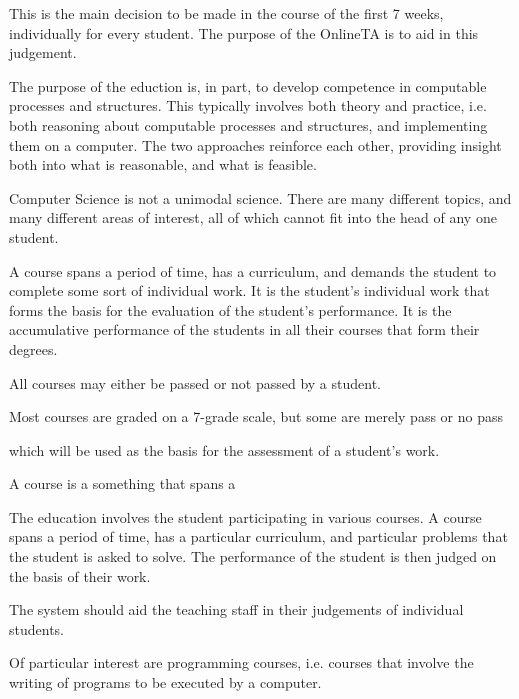This is the
main decision to be made in the course of the first 7 weeks, individually for
every student. The purpose of the OnlineTA is to aid in this judgement.

The purpose of the eduction is, in part, to develop competence in computable
processes and structures. This typically involves both theory and practice,
i.e. both reasoning about computable processes and structures, and implementing
them on a computer. The two approaches reinforce each other, providing insight
both into what is reasonable, and what is feasible.


Computer Science is not a unimodal science. There are many different topics,
and many different areas of interest, all of which cannot fit into the head of
any one student.

A course spans a period of time, has a curriculum, and demands the student to
complete some sort of individual work. It is the student's individual work that
forms the basis for the evaluation of the student's performance. It is the
accumulative performance of the students in all their courses that form their
degrees.

All courses may either be passed or not passed by a student.

Most courses are graded on a 7-grade scale, but some are merely pass or no pass

 which will be used as the basis for the assessment of a student's work.

A course is a something that spans a 

The education involves the student participating in various courses. A course
spans a period of time, has a particular curriculum, and particular problems
that the student is asked to solve. The performance of the student is then
judged on the basis of their work.

 The system
should aid the teaching staff in their judgements of individual students.

Of particular interest are programming courses, i.e. courses that involve the
writing of programs to be executed by a computer.
